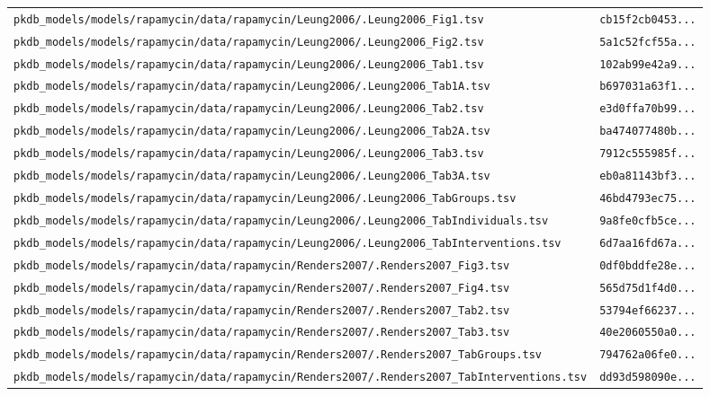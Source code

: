 \begin{longtable}{ll}
\texttt{pkdb\_models/models/rapamycin/data/rapamycin/Leung2006/.Leung2006\_Fig1.tsv} & \texttt{cb15f2cb0453...} \\
\texttt{pkdb\_models/models/rapamycin/data/rapamycin/Leung2006/.Leung2006\_Fig2.tsv} & \texttt{5a1c52fcf55a...} \\
\texttt{pkdb\_models/models/rapamycin/data/rapamycin/Leung2006/.Leung2006\_Tab1.tsv} & \texttt{102ab99e42a9...} \\
\texttt{pkdb\_models/models/rapamycin/data/rapamycin/Leung2006/.Leung2006\_Tab1A.tsv} & \texttt{b697031a63f1...} \\
\texttt{pkdb\_models/models/rapamycin/data/rapamycin/Leung2006/.Leung2006\_Tab2.tsv} & \texttt{e3d0ffa70b99...} \\
\texttt{pkdb\_models/models/rapamycin/data/rapamycin/Leung2006/.Leung2006\_Tab2A.tsv} & \texttt{ba474077480b...} \\
\texttt{pkdb\_models/models/rapamycin/data/rapamycin/Leung2006/.Leung2006\_Tab3.tsv} & \texttt{7912c555985f...} \\
\texttt{pkdb\_models/models/rapamycin/data/rapamycin/Leung2006/.Leung2006\_Tab3A.tsv} & \texttt{eb0a81143bf3...} \\
\texttt{pkdb\_models/models/rapamycin/data/rapamycin/Leung2006/.Leung2006\_TabGroups.tsv} & \texttt{46bd4793ec75...} \\
\texttt{pkdb\_models/models/rapamycin/data/rapamycin/Leung2006/.Leung2006\_TabIndividuals.tsv} & \texttt{9a8fe0cfb5ce...} \\
\texttt{pkdb\_models/models/rapamycin/data/rapamycin/Leung2006/.Leung2006\_TabInterventions.tsv} & \texttt{6d7aa16fd67a...} \\
\texttt{pkdb\_models/models/rapamycin/data/rapamycin/Renders2007/.Renders2007\_Fig3.tsv} & \texttt{0df0bddfe28e...} \\
\texttt{pkdb\_models/models/rapamycin/data/rapamycin/Renders2007/.Renders2007\_Fig4.tsv} & \texttt{565d75d1f4d0...} \\
\texttt{pkdb\_models/models/rapamycin/data/rapamycin/Renders2007/.Renders2007\_Tab2.tsv} & \texttt{53794ef66237...} \\
\texttt{pkdb\_models/models/rapamycin/data/rapamycin/Renders2007/.Renders2007\_Tab3.tsv} & \texttt{40e2060550a0...} \\
\texttt{pkdb\_models/models/rapamycin/data/rapamycin/Renders2007/.Renders2007\_TabGroups.tsv} & \texttt{794762a06fe0...} \\
\texttt{pkdb\_models/models/rapamycin/data/rapamycin/Renders2007/.Renders2007\_TabInterventions.tsv} & \texttt{dd93d598090e...} \\

\end{longtable}
